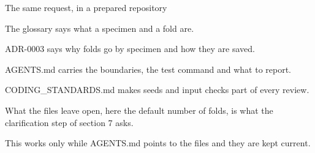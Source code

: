 \begin{frame}{The same request, in a prepared repository}
{    The glossary says what a specimen and a fold are.\par
    ADR-0003 says why folds go by specimen and how they are saved.\par
    AGENTS.md carries the boundaries, the test command and what to report.\par
    CODING\_STANDARDS.md makes seeds and input checks part of every review.\par
    What the files leave open, here the default number of folds, is what the clarification step
      of section 7 asks.\par
    This works only while AGENTS.md points to the files and they are kept current.}
\end{frame}
